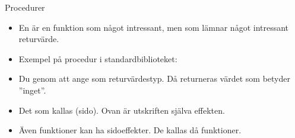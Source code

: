 %
%

\begin{Slide}{Procedurer}\SlideFontSmall
\begin{itemize}
\item En  är en funktion som  något intressant, men som  lämnar något intressant returvärde.
\item Exempel på procedur i standardbiblioteket: 
\item Du  genom att ange \texttt{} som returvärdestyp. Då returneras värdet \texttt{\Alert{()}} som betyder ''inget''.
\end{itemize}
\begin{itemize}
\item Det som  kallas (sido). Ovan är utskriften själva effekten.
\item Även funktioner kan ha sidoeffekter. De kallas då  funktioner.
\end{itemize}
\end{Slide}

